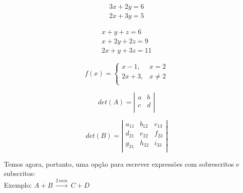 \documentclass[a4paper, 12pt]{article}
\begin{document}
\vspace{0.5cm}


\begin{eqnarray}
	3x + 2y = 6 \\
	2x + 3y = 5 
\end{eqnarray}

\vspace{0.5cm}

\begin{eqnarray}
	x + y + z = 6 \\
	x + 2y + 2z = 9 \\
	2x + y + 3z = 11
\end{eqnarray}

\vspace{0.5cm}

\begin{equation}
f(x) =
\left\lbrace
\begin{array}{cc}
	x - 1,& x = 2\\
	2x + 3,& x \neq 2\\
\end{array}
\right.
\end{equation}

\vspace{0.5cm}

\begin{equation}
det(A) =
\left\vert
\begin{array}{lr}
	a & b \\
	c & d \\
\end{array}
\right\vert
\end{equation}

\vspace{0.5cm}

\begin{equation}
det(B) =
\left\vert
\begin{array}{lcr}
	a_{11} & b_{12} & c_{13} \\
	d_{21} & e_{22} & f_{23} \\
	g_{31} & h_{32} & i_{33} \\
\end{array}
\right\vert
\end{equation}

\vspace{0.5cm}

Temos agora, portanto, uma opção para escrever expressões com sobrescritos e subscritos:\\


Exemplo: $A + B\, \stackrel{2\,min}{\longrightarrow}\, C + D$
\end{document}
